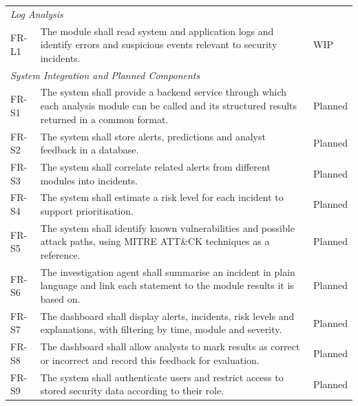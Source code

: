 {\begin{center}
\begin{longtable}{p{}p{}p{}}
  \multicolumn{3}{l}{\textit{Log Analysis}} \\
  FR-L1 & The module shall read system and application logs and identify errors and suspicious events relevant to security incidents. & WIP \\

  \multicolumn{3}{l}{\textit{System Integration and Planned Components}} \\
  FR-S1 & The system shall provide a backend service through which each analysis module can be called and its structured results returned in a common format. & Planned \\
  FR-S2 & The system shall store alerts, predictions and analyst feedback in a database. & Planned \\
  FR-S3 & The system shall correlate related alerts from different modules into incidents. & Planned \\
  FR-S4 & The system shall estimate a risk level for each incident to support prioritisation. & Planned \\
  FR-S5 & The system shall identify known vulnerabilities and possible attack paths, using MITRE ATT\&CK techniques as a reference. & Planned \\
  FR-S6 & The investigation agent shall summarise an incident in plain language and link each statement to the module results it is based on. & Planned \\
  FR-S7 & The dashboard shall display alerts, incidents, risk levels and explanations, with filtering by time, module and severity. & Planned \\
  FR-S8 & The dashboard shall allow analysts to mark results as correct or incorrect and record this feedback for evaluation. & Planned \\
  FR-S9 & The system shall authenticate users and restrict access to stored security data according to their role. & Planned \\
\end{longtable}
\end{center}}

\vspace{-35pt}
